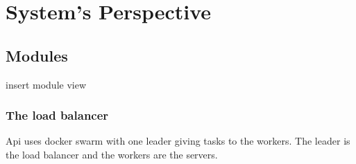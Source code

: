 \section{System's Perspective}
\label{ch:sys_persp} %

\subsection{Modules}
insert module view

\subsubsection{The load balancer}

Api uses docker swarm with one leader giving tasks 
to the workers. The leader is the load balancer 
and the workers are the servers. 



